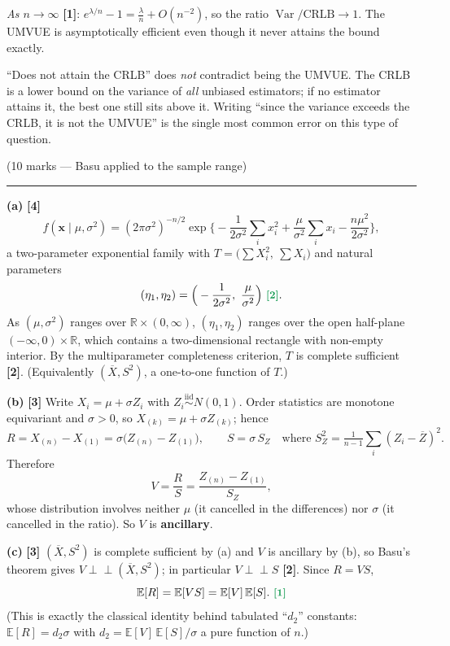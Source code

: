 \documentclass[11pt]{article}
\newcommand{\E}{\mathbb{E}}
\newcommand{\Var}{\operatorname{Var}}
\newcommand{\R}{\mathbb{R}}
\newcommand{\Xbar}{\overline{X}}
\newcommand{\Zbar}{\overline{Z}}
\newcommand{\iid}{\overset{\text{iid}}{\sim}}
\newcommand{\ind}{\perp\!\!\!\perp}
\newcommand{\mk}[1]{{\small\color{ForestGreen}\textbf{[#1]}}}
\newcommand{\qhead}[2]{\bigskip\noindent{\large\bfseries Question #1}\quad\textnormal{\small(#2)}\par
  \vspace{2pt}\hrule\vspace{6pt}}
\begin{document}
\emph{As $n\to\infty$} \mk{1}: $e^{\lambda/n}-1=\frac{\lambda}{n}+O(n^{-2})$, so the ratio
$\Var/\text{CRLB}\to1$. The UMVUE is asymptotically efficient even though it never attains the
bound exactly.

\begin{trapbox}
``Does not attain the CRLB'' does \emph{not} contradict being the UMVUE. The CRLB is a lower
bound on the variance of \emph{all} unbiased estimators; if no estimator attains it, the best
one still sits above it. Writing ``since the variance exceeds the CRLB, it is not the UMVUE''
is the single most common error on this type of question.
\end{trapbox}

\qhead{4}{10 marks --- Basu applied to the sample range}

\noindent\textbf{(a)} \mk{4}
\[
f(\mathbf x\mid\mu,\sigma^{2})
=(2\pi\sigma^{2})^{-n/2}\exp\Big\{-\frac{1}{2\sigma^{2}}\sum_ix_i^{2}
+\frac{\mu}{\sigma^{2}}\sum_ix_i-\frac{n\mu^{2}}{2\sigma^{2}}\Big\},
\]
a two-parameter exponential family with $T=\big(\sum X_i^{2},\ \sum X_i\big)$ and natural
parameters
\[
(\eta_1,\eta_2)=\Big(-\frac{1}{2\sigma^{2}},\ \frac{\mu}{\sigma^{2}}\Big)\ \mk{2}.
\]
As $(\mu,\sigma^{2})$ ranges over $\R\times(0,\infty)$, $(\eta_1,\eta_2)$ ranges over the open
half-plane $(-\infty,0)\times\R$, which contains a two-dimensional rectangle with non-empty
interior. By the multiparameter completeness criterion, $T$ is complete sufficient \mk{2}.
(Equivalently $(\Xbar,S^{2})$, a one-to-one function of $T$.)

\smallskip\noindent\textbf{(b)} \mk{3}
Write $X_i=\mu+\sigma Z_i$ with $Z_i\iid N(0,1)$. Order statistics are monotone equivariant
and $\sigma>0$, so $X_{(k)}=\mu+\sigma Z_{(k)}$; hence
\[
R=X_{(n)}-X_{(1)}=\sigma\big(Z_{(n)}-Z_{(1)}\big),\qquad
S=\sigma\,S_Z\quad\text{where }S_Z^2=\tfrac{1}{n-1}\textstyle\sum_i(Z_i-\Zbar)^2 .
\]
Therefore
\[
V=\frac{R}{S}=\frac{Z_{(n)}-Z_{(1)}}{S_Z},
\]
whose distribution involves neither $\mu$ (it cancelled in the differences) nor $\sigma$ (it
cancelled in the ratio). So $V$ is \textbf{ancillary}.

\smallskip\noindent\textbf{(c)} \mk{3}
$(\Xbar,S^{2})$ is complete sufficient by (a) and $V$ is ancillary by (b), so Basu's theorem
gives $V\ind(\Xbar,S^{2})$; in particular $V\ind S$ \mk{2}. Since $R=VS$,
\[
\E[R]=\E[VS]=\E[V]\,\E[S]. \ \mk{1}
\]
(This is exactly the classical identity behind tabulated ``$d_2$'' constants: $\E[R]=d_2\sigma$
with $d_2=\E[V]\,\E[S]/\sigma$ a pure function of $n$.)
\end{document}
